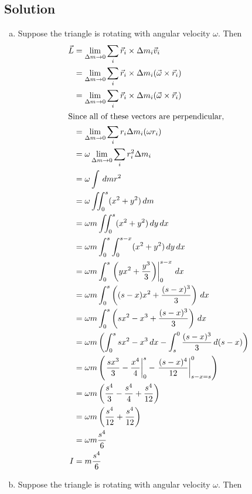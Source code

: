 \documentclass[solutions]{esg8012pset}
\renewcommand{\d}{\,d}
\begin{document}
\subsection{Solution}
  \begin{enumerate}[(a)]
    \item Suppose the triangle is rotating with angular velocity $\omega$.  Then \begin{align*}
      \vec L & = \lim_{\Delta m\to 0} \sum_{i} \vec r_i \times \Delta m_i \vec v_i \\
      & = \lim_{\Delta m\to 0} \sum_{i} \vec r_i \times \Delta m_i (\vec \omega \times \vec r_i) \\
      & = \lim_{\Delta m\to 0} \sum_{i} \vec r_i \times \Delta m_i (\vec \omega \times \vec r_i) \\
    \intertext{Since all of these vectors are perpendicular,}
      & = \lim_{\Delta m\to 0} \sum_{i} r_i \Delta m_i (\omega r_i) \\
      & = \omega \lim_{\Delta m\to 0} \sum_{i} r_i^2 \Delta m_i \\
      & = \omega \int \d m r^2 \\
      & = \omega \iint_0^s (x^2 + y^2)\d m \\
      & = \omega m \iint_0^s (x^2 + y^2)\d y\d x \\
      & = \omega m \int_0^s \int_0^{s-x} (x^2 + y^2)\d y\d x \\
      & = \omega m \int_0^s \left.\left(y x^2 + \frac{y^3}{3}\right)\right|_0^{s-x} \d x \\
      & = \omega m \int_0^s \left((s-x)x^2 + \frac{(s-x)^3}{3}\right) \d x \\
      & = \omega m \int_0^s \left(sx^2 - x^3 + \frac{(s-x)^3}{3}\right) \d x \\
      & = \omega m \left( \int_0^s sx^2 - x^3 \d x - \int_s^0 \frac{(s-x)^3}{3} \d (s-x) \right) \\
      & = \omega m \left( \left.\frac{sx^3}{3} - \frac{x^4}{4}\right|_0^s - \left.\frac{(s-x)^4}{12}\right|_{s-x=s}^0 \right) \\
      & = \omega m \left( \frac{s^4}{3} - \frac{s^4}{4} + \frac{s^4}{12}\right) \\
      & = \omega m \left( \frac{s^4}{12} + \frac{s^4}{12}\right) \\
      & = \omega m \frac{s^4}{6} \\
    I & = m \frac{s^4}{6}
    \end{align*}
    \item Suppose the triangle is rotating with angular velocity $\omega$.  Then \begin{align*}

\end{align*}
\end{enumerate}
\end{document}
